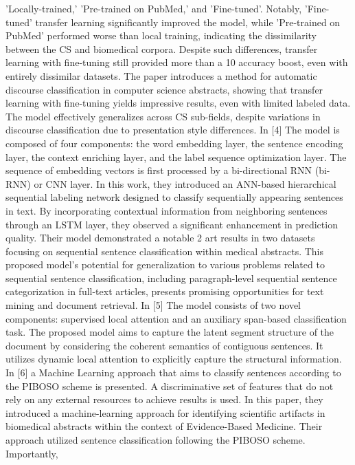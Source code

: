 \documentclass[conference]{IEEEtran}
\begin{document}
’Locally-trained,’ ’Pre-trained on PubMed,’ and ’Fine-tuned’.
Notably, ’Fine-tuned’ transfer learning significantly improved
the model, while ’Pre-trained on PubMed’ performed worse
than local training, indicating the dissimilarity between the
CS and biomedical corpora. Despite such differences, transfer
learning with fine-tuning still provided more than a 10%
accuracy boost, even with entirely dissimilar datasets. The
paper introduces a method for automatic discourse classification
in computer science abstracts, showing that transfer
learning with fine-tuning yields impressive results, even with
limited labeled data. The model effectively generalizes across
CS sub-fields, despite variations in discourse classification due
to presentation style differences.
In [4] The model is composed of four components: the word
embedding layer, the sentence encoding layer, the context
enriching layer, and the label sequence optimization layer.
The sequence of embedding vectors is first processed by a
bi-directional RNN (bi-RNN) or CNN layer. In this work,
they introduced an ANN-based hierarchical sequential labeling
network designed to classify sequentially appearing sentences
in text. By incorporating contextual information from neighboring
sentences through an LSTM layer, they observed a
significant enhancement in prediction quality. Their model
demonstrated a notable 2%
art results in two datasets focusing on sequential sentence
classification within medical abstracts. This proposed model’s
potential for generalization to various problems related to
sequential sentence classification, including paragraph-level
sequential sentence categorization in full-text articles, presents
promising opportunities for text mining and document retrieval.
In [5] The model consists of two novel components: supervised
local attention and an auxiliary span-based classification
task. The proposed model aims to capture the latent segment
structure of the document by considering the coherent semantics
of contiguous sentences. It utilizes dynamic local attention
to explicitly capture the structural information.
In [6] a Machine Learning approach that aims to classify
sentences according to the PIBOSO scheme is presented.
A discriminative set of features that do not rely on any
external resources to achieve results is used. In this paper,
they introduced a machine-learning approach for identifying
scientific artifacts in biomedical abstracts within the context
of Evidence-Based Medicine. Their approach utilized
sentence classification following the PIBOSO scheme. Importantly,
\end{document}
